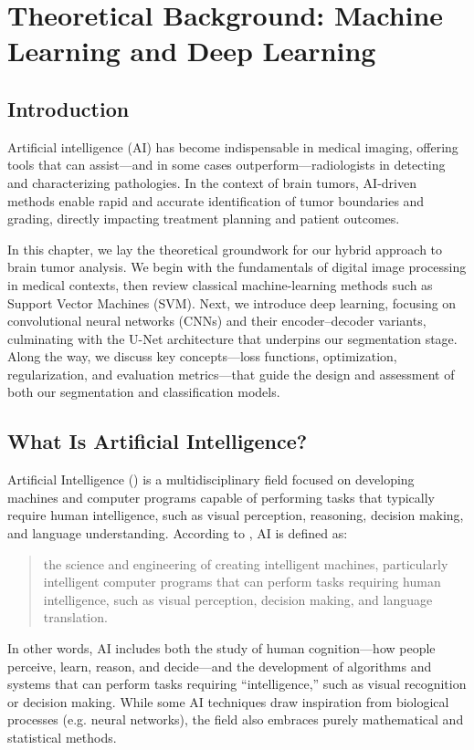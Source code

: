 \chapter{Theoretical Background: Machine Learning and Deep Learning}

\section{Introduction}
\label{sec:intro}
Artificial intelligence (AI) has become indispensable in medical imaging, offering tools that can assist—and in some cases outperform—radiologists in detecting and characterizing pathologies. In the context of brain tumors, AI-driven methods enable rapid and accurate identification of tumor boundaries and grading, directly impacting treatment planning and patient outcomes.

In this chapter, we lay the theoretical groundwork for our hybrid approach to brain tumor analysis. We begin with the fundamentals of digital image processing in medical contexts, then review classical machine-learning methods such as Support Vector Machines (SVM). Next, we introduce deep learning, focusing on convolutional neural networks (CNNs) and their encoder–decoder variants, culminating with the U-Net architecture that underpins our segmentation stage. Along the way, we discuss key concepts—loss functions, optimization, regularization, and evaluation metrics—that guide the design and assessment of both our segmentation and classification models.


\section{What Is Artificial Intelligence?}

Artificial Intelligence () is a multidisciplinary field focused on developing machines and computer programs capable of performing tasks that typically require human intelligence, such as visual perception, reasoning, decision making, and language understanding. According to \cite{sciencedirect_ai_overview}, AI is defined as:

\begin{quotation}
  the science and engineering of creating intelligent machines, particularly intelligent computer programs that can perform tasks requiring human intelligence, such as visual perception, decision making, and language translation.
\end{quotation}

In other words, AI includes both the study of human cognition—how people perceive, learn, reason, and decide—and the development of algorithms and systems that can perform tasks requiring “intelligence,” such as visual recognition or decision making. While some AI techniques draw inspiration from biological processes (e.g. neural networks), the field also embraces purely mathematical and statistical methods.
